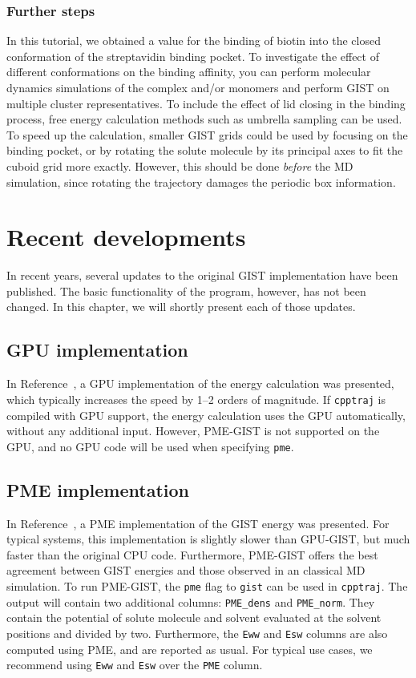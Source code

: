 \documentclass[9pt,tutorial]{livecoms}
\newcommand{\software}{\texttt}
\newcommand\inlinecode{\texttt}
\begin{document}
\subsubsection{Further steps}
In this tutorial, we obtained a value for the binding of biotin into the closed conformation of the streptavidin binding pocket.
To investigate the effect of different conformations on the binding affinity, you can perform molecular dynamics simulations of the complex and/or monomers and perform GIST on multiple cluster representatives.
To include the effect of lid closing in the binding process, free energy calculation methods such as umbrella sampling can be used.
To speed up the calculation, smaller GIST grids could be used by focusing on the binding pocket, or by rotating the solute molecule by its principal axes to fit the cuboid grid more exactly.
However, this should be done \emph{before} the MD simulation, since rotating the trajectory damages the periodic box information.

\section{Recent developments}
In recent years, several updates to the original GIST implementation have been published.
The basic functionality of the program, however, has not been changed.
In this chapter, we will shortly present each of those updates.
\subsection{GPU implementation}
In Reference~\cite{Kraml2020}, a GPU implementation of the energy calculation was presented, which typically increases the speed by 1--2 orders of magnitude.
If \software{cpptraj} is compiled with GPU support, the energy calculation uses the GPU automatically, without any additional input.
However, PME-GIST is not supported on the GPU, and no GPU code will be used when specifying \inlinecode{pme}.

\subsection{PME implementation}
In Reference~\cite{Chen2021}, a PME implementation of the GIST energy was presented.
For typical systems, this implementation is slightly slower than GPU-GIST, but much faster than the original CPU code.
Furthermore, PME-GIST offers the best agreement between GIST energies and those observed in an classical MD simulation.
To run PME-GIST, the \inlinecode{pme} flag to \inlinecode{gist} can be used in \software{cpptraj}.
The output will contain two additional columns: \inlinecode{PME\_dens} and \inlinecode{PME\_norm}.
They contain the potential of solute molecule and solvent evaluated at the solvent positions and divided by two.
Furthermore, the \inlinecode{Eww} and \inlinecode{Esw} columns are also computed using PME, and are reported as usual.
For typical use cases, we recommend using \inlinecode{Eww} and \inlinecode{Esw} over the \inlinecode{PME} column.
\end{document}
